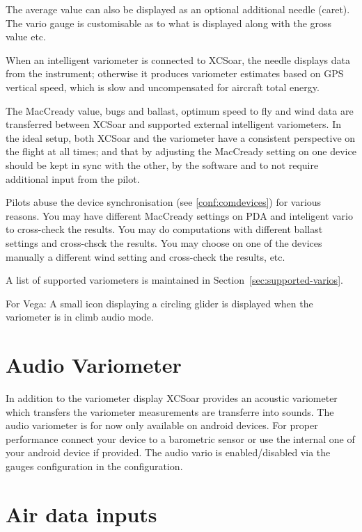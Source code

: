 The average value can also be displayed as an optional additional
needle (caret).
The vario gauge is customisable  as to what is displayed
along with the gross value etc.

When an intelligent variometer is connected to XCSoar, the needle
displays data from the instrument; otherwise it produces variometer
estimates based on GPS vertical speed, which is slow and uncompensated
for aircraft total energy.  

The MacCready value, bugs and ballast, optimum speed to fly and wind
data are transferred between XCSoar and supported external intelligent
variometers.  In the ideal setup, both XCSoar and the variometer have
a consistent perspective on the flight at all times; and that by
adjusting the MacCready setting on one device should be kept in sync
with the other, by the software and to not require additional input from
the pilot.

Pilots abuse the device synchronisation (see \ref{conf:comdevices}) for various 
reasons. You may have  different MacCready settings on PDA and inteligent vario 
to cross-check the results. You may do computations with different ballast 
settings and cross-chsck the results. You may choose on one of the devices 
manually a different wind setting and cross-check the results, etc.

A list of supported variometers is maintained in
Section~\ref{sec:supported-varios}.

For Vega: A small icon displaying a circling glider is displayed when
the variometer is in climb audio mode.

\section{Audio Variometer}

In addition to the variometer display XCSoar provides an acoustic variometer which transfers the 
variometer measurements are transferre into sounds. The audio variometer is for now only available 
on android devices. For proper performance connect your device to a barometric sensor or use the 
internal one of your android device if provided.
The audio vario is enabled/disabled via the gauges configuration in the configuration.


\section{Air data inputs}

